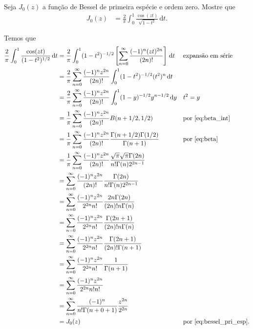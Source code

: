\documentclass[a4paper,12pt, leqno, answers]{exam}
\begin{document}
\begin{questions}
     Seja $J_0(z)$ a fun\c{c}\~{a}o de Bessel de primeira esp\'{e}cie e ordem zero. Mostre que
    \begin{align*}
        J_0(z) &= \frac{2}{\pi} \int_0^1 \frac{\cos(zt)}{\sqrt{1 - t^2}} \,\mathrm{d}t.
    \end{align*}
    \begin{solution}
        Temos que
        \begin{align*}
            \frac{2}{\pi} \int_0^1 \frac{\cos(zt)}{(1 - t^2)^{1/2}} \,\mathrm{d}t &= \frac{2}{\pi} \int_0^1 (1 - t^2)^{-1/2} \left[ \sum_{n = 0}^\infty \frac{(-1)^n (zt)^{2n}}{(2n)!} \right] \,\mathrm{d}t && \text{expans\~{a}o em s\'{e}rie} \\
            &= \frac{2}{\pi} \sum_{n = 0}^\infty \frac{(-1)^n z^{2n}}{(2n)!} \int_0^1 (1 - t^2)^{-1/2} (t^2)^n \,\mathrm{d}t \\
            &= \frac{2}{\pi} \sum_{n = 0}^\infty \frac{(-1)^n z^{2n}}{(2n)!} \int_0^1 (1 - y)^{-1/2} y^{n - 1/2} \,\mathrm{d}y && t^2 = y \\
            &= \frac{1}{\pi} \sum_{n = 0}^\infty \frac{(-1)^n z^{2n}}{(2n)!} B(n + 1/2, 1/2) && \text{por \eqref{eq:beta_int}} \\
            &= \frac{1}{\pi} \sum_{n = 0}^\infty \frac{(-1)^n z^{2n}}{(2n)!} \frac{\Gamma(n + 1/2) \Gamma(1/2)}{\Gamma(n + 1)} && \text{por \eqref{eq:beta}} \\
            &= \frac{1}{\pi} \sum_{n = 0}^\infty \frac{(-1)^n z^{2n}}{(2n)!} \frac{\sqrt{\pi} \sqrt{\pi} \Gamma(2n)}{n! \Gamma(n) 2^{2n - 1}} \\
            &= \sum_{n = 0}^\infty \frac{(-1)^n z^{2n}}{(2n)!} \frac{\Gamma(2n)}{n! \Gamma(n) 2^{2n - 1}} \\
            &= \sum_{n = 0}^\infty \frac{(-1)^n z^{2n}}{2^{2n} n!} \frac{2n \Gamma(2n)}{(2n)! n \Gamma(n)} \\
            &= \sum_{n = 0}^\infty \frac{(-1)^n z^{2n}}{2^{2n} n!} \frac{\Gamma(2n + 1)}{(2n)! n \Gamma(n)} \\
            &= \sum_{n = 0}^\infty \frac{(-1)^n z^{2n}}{2^{2n} n!} \frac{\Gamma(2n + 1)}{(2n)! \Gamma(n + 1)} \\
            &= \sum_{n = 0}^\infty \frac{(-1)^n z^{2n}}{2^{2n} n!} \frac{1}{\Gamma(n + 1)} \\
            &= \sum_{n = 0}^\infty \frac{(-1)^n z^{2n}}{2^{2n} n! n!} \\
            &= \sum_{n = 0}^\infty \frac{(-1)^n}{n! \Gamma(n + 0 + 1)} \frac{z^{2n}}{2^{2n}} \\
            &= J_0(z) && \text{por \eqref{eq:bessel_pri_esp}}.
        \end{align*}
    \end{solution}


\end{questions}
\end{document}
